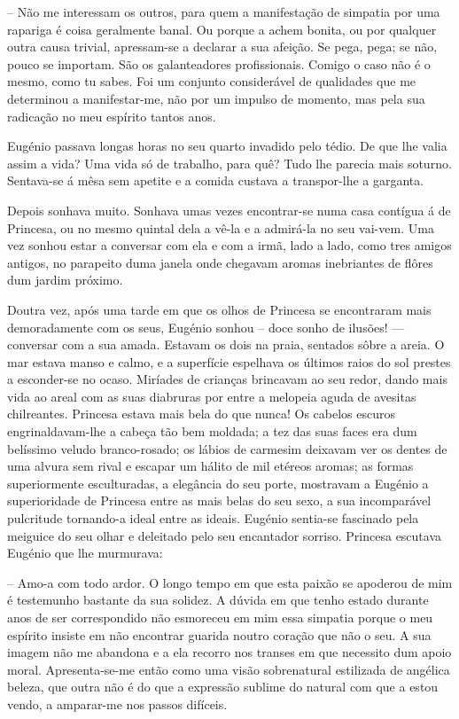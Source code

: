 \documentclass[9pt]{article}
\begin{document}
-- Não me interessam os outros, para quem a manifesta\-ção de simpatia
por uma rapariga é coisa geralmente banal. Ou porque a achem bonita, ou
por qualquer outra causa trivial, apressam-se a declarar a sua afei\-ção.
Se pega, pega; se não, pouco se importam. São os galanteadores profissionais.
Comigo o caso não é o mesmo, como tu sabes. Foi um conjunto considerável
de qualidades que me determinou a manifes\-\mbox{tar-me}, não por um impulso de
momento, mas pela sua radica\-ção no meu espírito tantos anos.

Eugé\-nio passava longas horas no seu quarto invadido pelo tédio. De
que lhe valia assim a vida? Uma vida só de traba\-lho, para quê? Tudo lhe
parecia mais soturno. Sentava-se á mêsa sem apetite e a comida custava
a transpor-\-lhe a garganta.

Depois sonhava muito. Sonhava umas vezes encontrar-se numa casa contígua á
de Princesa, ou no mesmo quintal dela a vê-la e a admirá-la no seu vai-vem.
Uma vez sonhou estar a conversar com ela e com a irmã, lado a lado, como
tres amigos antigos, no parapeito duma janela onde chegavam aromas inebriantes de flôres dum jardim próximo.

Doutra vez, após uma tarde em que os o\-lhos de Princesa se encon\-tra\-ram mais demoradamente com os seus, Eugé\-nio sonhou -- doce sonho de ilusões! — conversar com a sua amada. Estavam os dois na praia, sentados
sôbre a areia. O mar estava manso e calmo, e a superfície espe\-lhava os
últimos raios do sol prestes a esconder-se no ocaso. Miríades de crian\-ças brincavam ao seu redor, dando mais vida ao areal com as suas diabruras por entre a melopeia aguda de avesitas chilreantes. Princesa estava
mais bela do que nunca! Os cabelos escuros engrinaldavam-lhe a cabeça
tão bem moldada; a tez das suas faces era dum belíssimo veludo branco-rosado; os lábios de carmesim deixavam ver os dentes de uma alvura sem
rival e escapar um hálito de mil etéreos aromas; as formas superiormente esculturadas, a elegância do seu porte, mostravam a Eugé\-nio a superioridade de Princesa entre as mais belas do seu sexo, a sua incomparável pulcritude tornando-a ideal entre as ideais. Eugé\-nio sentia-se fascinado pela meiguice do seu o\-lhar e deleitado pelo seu encantador sorriso. Princesa escutava Eugé\-nio que lhe murmurava:

-- Amo-a com todo ardor. O longo tempo em que esta paixão se apoderou de mim é testemunho bastante da sua solidez. A dúvida em que tenho
estado durante anos de ser correspondido não esmoreceu em mim essa simpatia porque o meu espírito insiste em não encontrar guarida noutro cora\-ção que não o seu. A sua imagem não me abandona e a ela recorro nos
transes em que necessito dum apoio moral. \mbox{Apresenta-se-me} então como uma %
visão sobrenatural estilizada de angélica beleza, que outra não é do que a
ex\-pres\-são sublime do natural com que a estou vendo, a amparar-me nos passos
difíceis.
\end{document}
